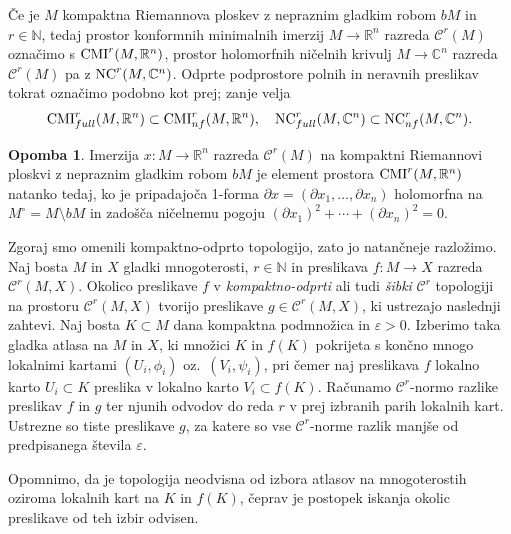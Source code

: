 \documentclass[12pt,a4paper,twoside]{article}
\theoremstyle{definition} %
\newtheorem{opomba}[definicija]{Opomba}
\theoremstyle{plain} %
\numberwithin{equation}{section}  %
\newcommand{\R}{\mathbb R}
\newcommand{\N}{\mathbb N}
\newcommand{\C}{\mathbb C}
\begin{document}
Če je $M$ kompaktna Riemannova ploskev z nepraznim gladkim robom $bM$ in $r \in \N$, tedaj prostor konformnih minimalnih imerzij $M \to \R^{n}$ razreda $\mathcal{C}^{r}(M)$ označimo s $\textup{CMI}^{r}(M, \R^{n})$, prostor holomorfnih ničelnih krivulj $M \to \C^{n}$ razreda $\mathcal{C}^{r}(M)$ pa z $\textup{NC}^{r}(M, \C^{n})$.
Odprte podprostore polnih in neravnih preslikav tokrat označimo podobno kot prej; zanje velja
\begin{gather*}
\textup{CMI}_{full}^{r}(M, \R^{n}) \subset \textup{CMI}_{nf}^{r}(M, \R^{n}), \quad \textup{NC}_{full}^{r}(M, \C^{n}) \subset \textup{NC}_{nf}^{r}(M, \C^{n}).
\end{gather*}

\begin{opomba}
Imerzija $x \colon M \to \mathbb{R}^{n}$ razreda $\mathcal{C}^{r}(M)$ na kompaktni Riemannovi ploskvi z nepraznim gladkim robom $bM$ je element prostora $\textup{CMI}^{r}(M, \R^{n})$ natanko tedaj, ko je pripadajoča 1-forma $\partial x = (\partial x_{1}, \dots , \partial x_{n})$ holomorfna na $M^{\circ} = M \setminus bM$ in zadošča ničelnemu pogoju $(\partial{x_1})^2 + \cdots + (\partial{x_n})^2 = 0$.
\end{opomba}

Zgoraj smo omenili kompaktno-odprto topologijo, zato jo natančneje razložimo.
Naj bosta $M$ in $X$ gladki mnogoterosti, $r \in \mathbb{N}$ in preslikava $f \colon M \to X$ razreda $\mathcal{C}^{r}(M,X)$. 
Okolico preslikave $f$ v \emph{kompaktno-odprti} ali tudi \emph{šibki} $\mathcal{C}^{r}$ topologiji na prostoru $\mathcal{C}^{r}(M,X)$ tvorijo preslikave $g \in \mathcal{C}^{r}(M,X)$, ki ustrezajo naslednji zahtevi. 
Naj bosta $K \subset M$ dana kompaktna podmnožica in $\varepsilon > 0$. Izberimo taka gladka atlasa na $M$ in $X$, ki množici $K$ in $f(K)$ pokrijeta s končno mnogo lokalnimi kartami $(U_{i}, \phi_{i})$ oz.~$(V_{i}, \psi_{i})$, pri čemer naj preslikava $f$ lokalno karto $U_{i} \subset K$ preslika v lokalno karto $V_{i} \subset f(K)$. 
Računamo $\mathcal{C}^{r}$-normo razlike preslikav $f$ in $g$ ter njunih odvodov do reda $r$ v prej izbranih parih lokalnih kart. Ustrezne so tiste preslikave $g$, za katere so vse $\mathcal{C}^{r}$-norme razlik manjše od predpisanega števila $\varepsilon$.

Opomnimo, da je topologija neodvisna od izbora atlasov na mnogoterostih oziroma lokalnih kart na $K$ in $f(K)$, čeprav je postopek iskanja okolic preslikave od teh izbir odvisen.
\end{document}

